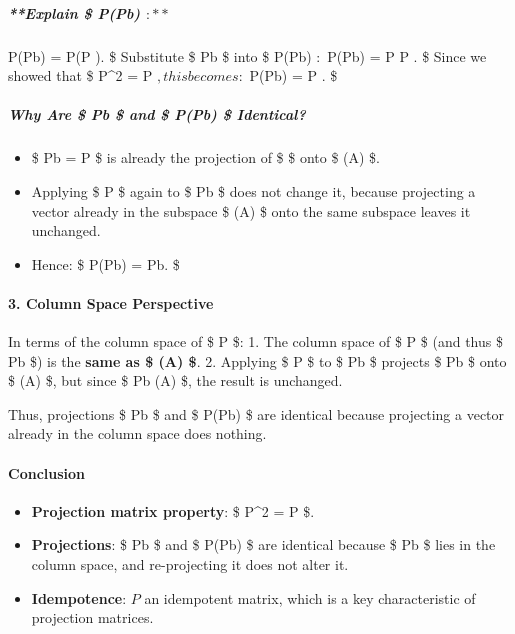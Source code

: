\documentclass[11pt]{article}
\makeatletter
\providecommand{\tightlist}{%
      \setlength{\itemsep}{0pt}\setlength{\parskip}{0pt}}
\newcommand{\boxspacing}{\kern\kvtcb@left@rule\kern\kvtcb@boxsep}
\newcommand{\prompt}[4]{
        {\ttfamily\llap{{\color{#2}[#3]:\hspace{3pt}#4}}\vspace{-\baselineskip}}
    }
\makeatother
\begin{document}
\subparagraph{\texorpdfstring{**Explain \$ P(Pb)
\(:**\)}{**Explain \$ P(Pb) :**}}\label{explain-ppb}

P(Pb) = P(P ). \$ Substitute \$ Pb \$ into \$ P(Pb) \(:\)
P(Pb) = P \cdot P . \$ Since we showed that \$ P\^{}2 = P
\(, this becomes:\) P(Pb) = P . \$

\subparagraph{\texorpdfstring{\textbf{Why Are \$ Pb \$ and \$ P(Pb) \$
Identical?}}{Why Are \$ Pb \$ and \$ P(Pb) \$ Identical?}}\label{why-are-pb-and-ppb-identical}

\begin{itemize}
\tightlist
\item
  \$ Pb = P  \$ is already the projection of \$  \$
  onto \$ (A) \$.
\item
  Applying \$ P \$ again to \$ Pb \$ does not change it, because
  projecting a vector already in the subspace \$ (A) \$ onto
  the same subspace leaves it unchanged.
\item
  Hence: \$ P(Pb) = Pb. \$
\end{itemize}

\paragraph{\texorpdfstring{\textbf{3. Column Space
Perspective}}{3. Column Space Perspective}}\label{column-space-perspective}

In terms of the column space of \$ P \$: 1. The column space of \$ P \$
(and thus \$ Pb \$) is the \textbf{same as \$ (A) \$}. 2.
Applying \$ P \$ to \$ Pb \$ projects \$ Pb \$ onto \$ (A) \$,
but since \$ Pb \in {}(A) \$, the result is unchanged.

Thus, projections \$ Pb \$ and \$ P(Pb) \$ are identical because
projecting a vector already in the column space does nothing.

\paragraph{\texorpdfstring{\textbf{Conclusion}}{Conclusion}}\label{conclusion}

\begin{itemize}
\tightlist
\item
  \textbf{Projection matrix property}: \$ P\^{}2 = P \$.
\item
  \textbf{Projections}: \$ Pb \$ and \$ P(Pb) \$ are identical because
  \$ Pb \$ lies in the column space, and re-projecting it does not alter
  it.
\item
  \textbf{Idempotence}: \(P\) an idempotent matrix, which is a key
  characteristic of projection matrices.
\end{itemize}

    \begin{tcolorbox}[breakable, size=fbox, boxrule=1pt, pad at break*=1mm,colback=cellbackground, colframe=cellborder]
\prompt{In}{incolor}{ }{\boxspacing}
\begin{Verbatim}[commandchars=\\\{\}]

\end{Verbatim}
\end{tcolorbox}


    
    
    
\end{document}
